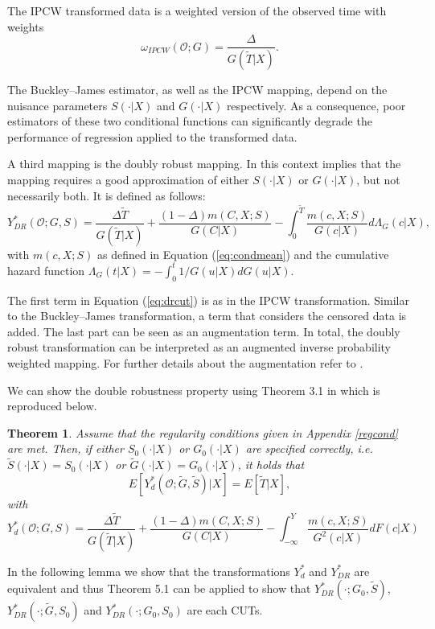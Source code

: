 \documentclass[12pt, a4paper]{scrartcl}
\theoremstyle{definition}
\theoremstyle{plain}
\newtheorem{Theorem}{Theorem}[section]
\numberwithin{equation}{section}
\numberwithin{figure}{section}
\numberwithin{table}{section}
\begin{document}
	The IPCW transformed data is a weighted version of the observed time with weights
	\begin{equation}\label{eq:ipcw}
	\omega_{IPCW}(\mathcal{O}; G) = \frac{\Delta}{G(\tilde T \vert X)}.
	\end{equation}

	The Buckley--James estimator, as well as the IPCW mapping, depend on the nuisance parameters $S(\cdot\vert X)$ and $G(\cdot\vert X)$ respectively.
	As a consequence, poor estimators of these two conditional functions can significantly degrade the performance of regression applied to the transformed data.
	
	A third mapping is the doubly robust mapping.
	In this context  implies that the mapping requires a good approximation of either  $S(\cdot\vert X)$ or $G(\cdot\vert X)$, but not necessarily both.
	It is defined as follows:
	\begin{equation}\label{eq:drcut}
	Y_{DR}^* (\mathcal{O}; G, S) = \frac{\Delta \tilde T}{G(\tilde T\vert X)} + \frac{(1-\Delta)m(C,X;S)}{G(C \vert X)} - \int_{0}^{\tilde T} \frac{m(c,X;S)}{G(c \vert X)} d\Lambda_G(c \vert X),
	\end{equation}
	with $m(c,X;S)$ as defined in Equation (\ref{eq:condmean}) and the cumulative hazard function $\Lambda_G(t\vert X)=-\int_{0}^{t}1/G(u\vert X)dG(u\vert X)$.
	
	The first term in Equation (\ref{eq:drcut}) is as in the IPCW transformation.
	Similar to the Buckley--James transformation, a term that considers the censored data is added.
	The last part can be seen as an augmentation term.
	In total, the doubly robust transformation can be interpreted as an augmented inverse probability weighted mapping.
	For further details about the augmentation refer to \citet*{bookfailuretime}.
		
	We can show the double robustness property using Theorem 3.1 in \citet*{drcut} which is reproduced below.
	
	\begin{Theorem}\label{thm:dr}
		Assume that the regularity conditions given in Appendix \ref{regcond} are met.
		Then, if either $S_0(\cdot\vert X)$ or $G_0(\cdot\vert X)$ are specified correctly, i.e. $\tilde{S}(\cdot\vert X)=S_0(\cdot\vert X)$ or $\tilde{G}(\cdot\vert X)=G_0(\cdot\vert X)$, it holds that
		\begin{equation*}
		E[Y_{d}^*(\mathcal{O};\tilde{G}, \tilde{S})\vert X] = E[\tilde T \vert X],
		\end{equation*}
		with 
		\begin{equation}\label{eq:drcut2}
		Y_d^*(\mathcal{O}; G,S) = \frac{\Delta \tilde T}{G(\tilde T\vert X)}+\frac{(1-\Delta)m(C,X;S)}{G(C \vert X)}-\int_{-\infty}^{Y}\frac{m(c,X;S)}{G^2(c\vert X)}dF(c\vert X)
		\end{equation}
	\end{Theorem}
	In the following lemma we show that the transformations $Y_d^*$ and $Y_{DR}^*$ are equivalent and thus Theorem 5.1 can be applied to show that $Y_{DR}^*(\cdot; G_0, \tilde{S})$, $Y_{DR}^*(\cdot; \tilde{G}, S_0)$ and $Y_{DR}^*(\cdot; G_0, S_0)$ are each CUTs.
	
\end{document}
